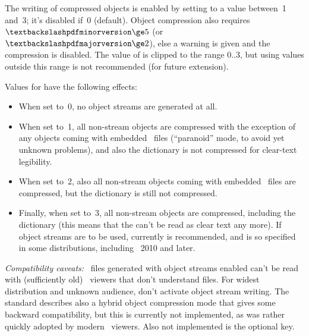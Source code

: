\documentclass{pdftexmanual}
\begin{document}
The writing of compressed objects is enabled by setting
 to a value between~1 and~3; it's disabled if~0
(default). Object compression also requires
$\cs{pdfminorversion}\ge5$ (or $\cs{pdfmajorversion}\ge2$), else
a warning is given and the compression is disabled. The value of
 is clipped to the range $0..3$, but using
values outside this range is not recommended (for future extension).

Values for  have the following effects:

\begin{itemize}
\item When set to~0, no object streams are generated at all.

\item When set to~1,
all non-stream objects are compressed with the exception of any objects
coming with embedded \PDF\ files (``paranoid'' mode, to avoid yet unknown
problems), and also the  dictionary is not compressed for
clear-text legibility.

\item When set to~2, also all non-stream objects coming
with embedded \PDF\ files are compressed, but the  dictionary
is still not compressed.

\item Finally, when set to~3, all non-stream objects
are compressed, including the  dictionary (this means that
the  can't be read as clear text any more). If object streams
are to be used, currently  is recommended,
and is so specified in some distributions, including \TEXLIVE~2010 and later.
\end{itemize}

\emph{Compatibility caveats:} \PDF\ files generated with object
streams enabled can't be read with (sufficiently old) \PDF\ viewers that
don't understand  files. For widest distribution and unknown
audience, don't activate object stream writing. The  standard
describes also a hybrid object compression mode that gives some backward
compatibility, but this is currently not implemented, as  was
rather quickly adopted by modern \PDF\ viewers. Also not implemented is
the optional  key.

\subsection{}
\end{document}
